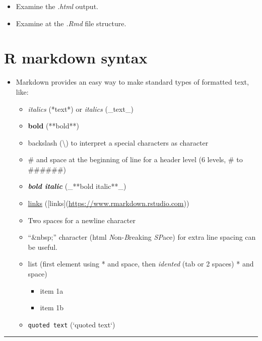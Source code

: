 \documentclass[]{article}
\providecommand{\tightlist}{%
  \setlength{\itemsep}{0pt}\setlength{\parskip}{0pt}}
\begin{document}
\begin{itemize}
\item
  Examine the \emph{.html} output.
\item
  Examine at the \emph{.Rmd} file structure.
\end{itemize}

\hypertarget{r-markdown-syntax}{%
\section{R markdown syntax}\label{r-markdown-syntax}}

\begin{itemize}
\item
  Markdown provides an easy way to make standard types of formatted
  text, like:

  \begin{itemize}
  \item
    \emph{italics} (*text*) or \emph{italics} (\_text\_)
  \item
    \textbf{bold} (**bold**)
  \item
    backslash (\textbackslash{}) to interpret a special characters as
    character
  \item
    \# and space at the beginning of line for a header level (6 levels,
    \# to \#\#\#\#\#\#)
  \item
    \emph{\textbf{bold italic}} (\_**bold italic**\_)
  \item
    \href{https://www.rmarkdown.rstudio.com}{links}
    ({[}links{]}(\url{https://www.rmarkdown.rstudio.com}))
  \item
    Two spaces for a newline character
  \item
    ``\&nbsp;'' character (html \emph{N}on-\emph{B}reaking \emph{SP}ace)
    for extra line spacing can be useful.
  \item
    list (first element using * and space, then \emph{idented} (tab or 2
    spaces) * and space)

    \begin{itemize}
    \tightlist
    \item
      item 1a
    \item
      item 1b
    \end{itemize}
  \item
    \texttt{quoted\ text} (`quoted text`)
  \end{itemize}
\end{itemize}

\begin{center}\rule{0.5\linewidth}{\linethickness}\end{center}
\end{document}
